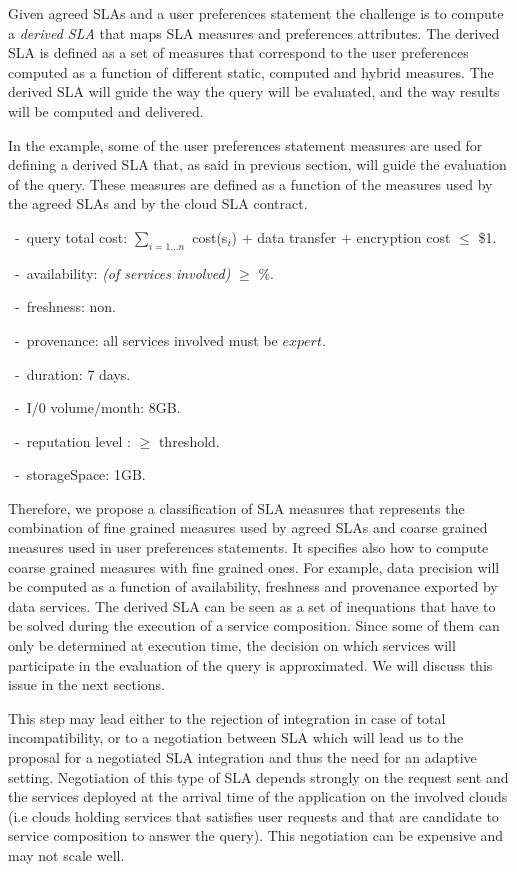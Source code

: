 Given agreed SLAs and a user preferences statement the challenge is to compute a  {\em derived SLA} that  maps SLA measures and preferences attributes.  
The derived SLA is defined as a set of measures that correspond to the user preferences computed as a function of different static, computed and hybrid measures. 
The derived SLA  will guide the way the query will be evaluated, and the way results will be computed and delivered.

In the example, some of the user preferences statement measures are used for defining a derived SLA that, as said in previous section, will guide the evaluation of the query. 
These measures are defined as a function of the measures used by the agreed SLAs and by the cloud SLA contract.
\begin{trivlist}\sf\footnotesize
 \item[~-~query total cost:] $\sum_{i = 1\dots n}$ cost(s$_i$) + data transfer + encryption cost $\leq$ \$1.
 \item[~-~availability:] {\em (of services involved)} $\geq$ {$\%$}.
 \item[~-~freshness:] non.
 \item[~-~provenance:] all services involved must be $expert$.
 \item[~-~duration:] 7 days.
 \item[~-~I/0 volume/month:] 8GB.
 \item[~-~reputation level :] $\geq$ threshold.
 \item[~-~storageSpace:] 1GB.
 \end{trivlist} 
 
Therefore, we propose a classification of SLA measures that represents the combination of fine grained measures used by agreed SLAs and coarse grained measures used in user preferences statements. 
It specifies also how to compute coarse grained measures with fine grained ones. 
For example, data precision will be computed as a function of availability, freshness and provenance exported by data services. The derived SLA can be seen as a set of inequations that have to be solved during the execution of a service composition. Since some of them can only be determined at execution time, the decision on which services will participate in the evaluation of the query is approximated. We will discuss this issue in the next sections.

This step may lead either to the rejection of integration in case of total incompatibility, or to a negotiation between SLA which will lead us to the proposal for a negotiated SLA integration and thus the need for an adaptive setting.
Negotiation of this type of SLA depends strongly on the request sent and the services deployed at the arrival time of the application on the involved  clouds (i.e clouds holding services that satisfies user requests and that are candidate to service composition to answer the query). This negotiation can be expensive and may not scale well.
 
